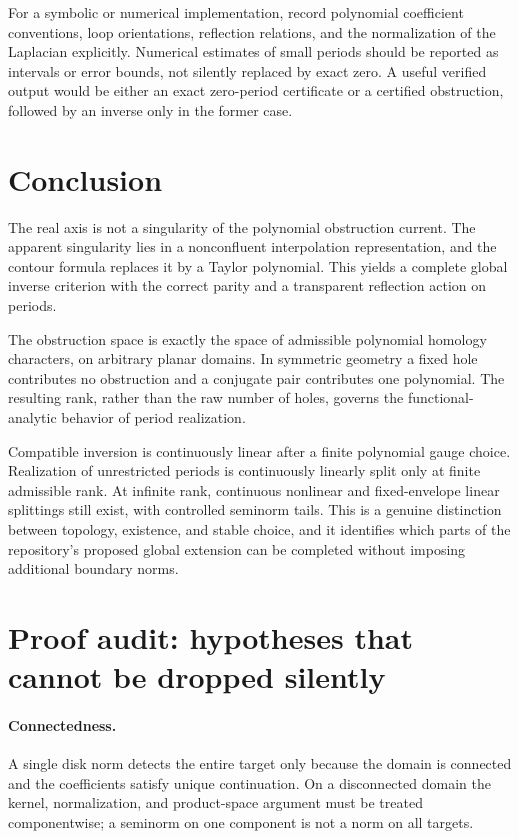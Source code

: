 \documentclass[11pt,a4paper]{article}
\numberwithin{equation}{section}
\theoremstyle{definition}
\theoremstyle{remark}
\begin{document}
For a symbolic or numerical implementation, record polynomial coefficient
conventions, loop orientations, reflection relations, and the normalization
of the Laplacian explicitly. Numerical estimates of small periods should be
reported as intervals or error bounds, not silently replaced by exact zero.
A useful verified output would be either an exact zero-period certificate or
a certified obstruction, followed by an inverse only in the former case.

\section{Conclusion}

The real axis is not a singularity of the polynomial obstruction current.
The apparent singularity lies in a nonconfluent interpolation representation,
and the contour formula replaces it by a Taylor polynomial. This yields a
complete global inverse criterion with the correct parity and a transparent
reflection action on periods.

The obstruction space is exactly the space of admissible polynomial homology
characters, on arbitrary planar domains. In symmetric geometry a fixed hole
contributes no obstruction and a conjugate pair contributes one polynomial.
The resulting rank, rather than the raw number of holes, governs the
functional-analytic behavior of period realization.

Compatible inversion is continuously linear after a finite polynomial gauge
choice. Realization of unrestricted periods is continuously linearly split
only at finite admissible rank. At infinite rank, continuous nonlinear and
fixed-envelope linear splittings still exist, with controlled seminorm tails.
This is a genuine distinction between topology, existence, and stable choice,
and it identifies which parts of the repository's proposed global extension
can be completed without imposing additional boundary norms.

\appendix
\section{Proof audit: hypotheses that cannot be dropped silently}
\label{app:audit}

\paragraph{Connectedness.}
A single disk norm detects the entire target only because the domain is
connected and the coefficients satisfy unique continuation. On a disconnected
domain the kernel, normalization, and product-space argument must be treated
componentwise; a seminorm on one component is not a norm on all targets.
\end{document}
